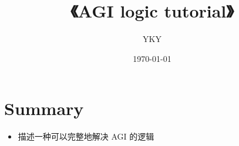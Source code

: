 


\usepackage{color}
\usepackage{mathtools}
\usepackage{hyperref}

\usepackage[backend=biber,style=numeric]{biblatex}


\usepackage{graphicx} %
\usepackage{tikz-cd}
\usepackage[export]{adjustbox}%
\usepackage{verbatim} %

\newcommand{\underdash}[1]{%
	\tikz[baseline=(toUnderline.base)]{
		\node[inner sep=1pt,outer sep=10pt] (toUnderline) {#1};
		\draw[dashed] ([yshift=-0pt]toUnderline.south west) -- ([yshift=-0pt]toUnderline.south east);
	}%
}%


\newcommand{\emp}[1]{{\color{violet}\textbf{#1}}}
\newcommand*\confoundFace{$\vcenter{\hbox{\texttt{[image: ../confounded-face.jpg]}}}$}



\title{\cc{\bfseries\color{blue}{\Huge《AGI 逻辑导论》}}
{{\Huge《AGI logic tutorial》} }}
\author{YKY} %
\date{\today} %

\maketitle

\section*{Summary}
\begin{itemize}
	\item 描述一种可以完整地解决 AGI 的逻辑
\end{itemize}

